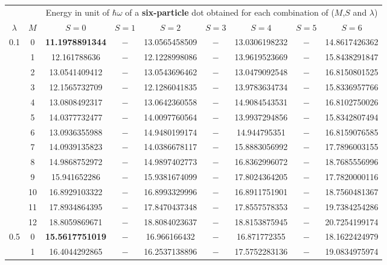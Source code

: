 \begin{table}[ht]
\centering      %
{\scriptsize
\begin{tabular}{c|c|c|c|c|c|c|c|c}  %
\toprule[1pt]
\multicolumn{1}{c|}{ } & \multicolumn{1}{c|}{ } &\multicolumn{7}{c}{Energy in unit of $\hbar \omega$ of a \textbf{six-particle} dot obtained for each combination of ($M$,$S$ and $\lambda$)} \\
$\lambda$ & $M$ & $S=0$& $S=1$ & $S=2$ & $S=3$ & $S=4$ & $S=5$ & $S=6$  \\
\hline                    %
\hline                    %
\multirow{13}{*}{0.1} & 0 & \textbf{11.1978891344}& $-$& 13.0565458509& $-$& 13.0306198232& $-$& 14.8617426362\\ 
& 1 & 12.161788636& $-$& 12.1228998086& $-$& 13.9619523669& $-$& 15.8438291847\\ 
& 2 & 13.0541409412& $-$& 13.0543696462& $-$& 13.0479092548& $-$& 16.8150801525\\ 
& 3 & 12.1565732709& $-$& 12.1286041835& $-$& 13.9783634734& $-$& 15.8336957766\\ 
& 4 & 13.0808492317& $-$& 13.0642360558& $-$& 14.9084543531& $-$& 16.8102750026\\ 
& 5 & 14.0377732477& $-$& 14.0097760564& $-$& 13.9937294856& $-$& 15.8342807494\\ 
& 6 & 13.0936355988& $-$& 14.9480199174& $-$& 14.944795351& $-$& 16.8159076585\\ 
& 7 & 14.0939135823& $-$& 14.0386678117& $-$& 15.8883056992& $-$& 17.7896003155\\ 
& 8 & 14.9868752972& $-$& 14.9897402773& $-$& 16.8362996072& $-$& 18.7685556996\\ 
& 9 & 15.941652286& $-$& 15.9381674099& $-$& 17.8024364205& $-$& 17.7820000116\\ 
& 10 & 16.8929103322& $-$& 16.8993329996& $-$& 16.8911751901& $-$& 18.7560481367\\ 
& 11 & 17.8934864395& $-$& 17.8470437348& $-$& 17.8557578353& $-$& 19.7384254286\\ 
& 12 & 18.8059869671& $-$& 18.8084023637& $-$& 18.8153875945& $-$& 20.7254199174\\ 
\hline                    %
\multirow{13}{*}{0.5} & 0 & \textbf{15.5617751019}& $-$& 16.966166432& $-$& 16.871772355& $-$& 18.1622424979\\ 
& 1 & 16.4044292865& $-$& 16.2537138896& $-$& 17.5752283136& $-$& 19.0834975974\\ 

\end{tabular}}
\end{table}
